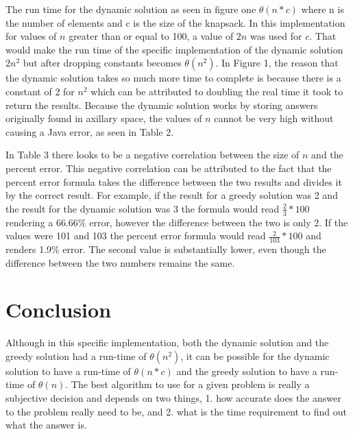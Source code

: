 \documentclass[onecolumn, 12pt, article]{IEEEtran}
\numberwithin{case}{problem}
\numberwithin{condition}{problem}
\numberwithin{condition}{subsection}
\numberwithin{definition}{section}
\theoremstyle{remark}
\numberwithin{question}{problem}
\theoremstyle{plain}
\numberwithin{answer}{problem}
\numberwithin{solution}{section}
\numberwithin{equation}{section}%
\begin{document}
The run time for the dynamic solution as seen in figure one $ \theta(n*c) $ where n is the number of elements and c is the size of the knapsack. In this implementation for values of $n$ greater than or equal to 100, a value of $2n$ was used for $c$. That would make the run time of the specific implementation of the dynamic solution $2n^2$ but after dropping constants becomes $ \theta(n^2) $. In Figure 1, the reason that the dynamic solution takes so much more time to complete is because there is a constant of 2 for $n^2$ which can be attributed to doubling the real time it took to return the results. Because the dynamic solution works by storing answers originally found in axillary space, the values of $n$ cannot be very high without causing a Java error, as seen in Table 2. 

In Table 3 there looks to be a negative correlation between the size of $n$ and the percent error. This negative correlation can be attributed to the fact that the percent error formula takes the difference between the two results and divides it by the correct result. For example, if the result for a greedy solution was 2 and the result for the dynamic solution was 3 the formula would read $ \frac{2}{3} * 100 $ rendering a 66.66\% error, however the difference between the two is only 2. If the values were 101 and 103 the percent error formula would read $ \frac{2}{103} * 100 $ and renders 1.9\% error. The second value is substantially lower, even though the difference between the two numbers remains the same.


\section{Conclusion}
Although in this specific implementation, both the dynamic solution and the greedy solution had a run-time of $\theta(n^2)$, it can be possible for the dynamic solution to have a run-time of $\theta(n*c)$ and the greedy solution to have a run-time of $\theta(n)$. The best algorithm to use for a given problem is really a subjective decision and depends on two things, 1. how accurate does the answer to the problem really need to be, and 2. what is the time requirement to find out what the answer is. 


\newpage

\end{document}
